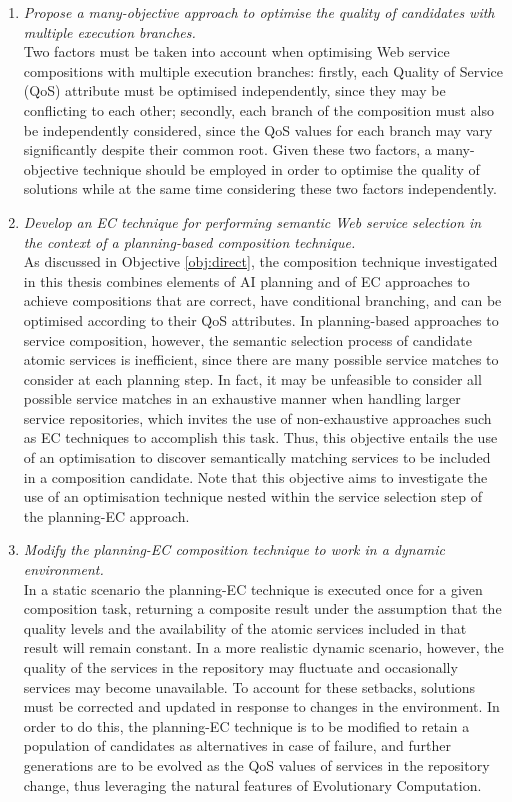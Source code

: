 \begin{enumerate}
 \item \label{obj:mo} \textit{Propose a many-objective approach to optimise the quality of candidates with multiple execution branches.}\\
 Two factors must be taken into account when optimising Web service compositions with multiple execution branches: firstly, each Quality of Service (QoS) attribute must be optimised independently, since they may be conflicting to each other; secondly, each branch of the composition must also be independently considered, since the QoS values for each branch may vary significantly despite their common root. Given these two factors, a many-objective technique should be employed in order to optimise the quality of solutions while at the same time considering these two factors independently.
 
 \item \label{obj:semantic} \textit{Develop an EC technique for performing semantic Web service selection in the context of a planning-based composition technique.}\\
 As discussed in Objective \ref{obj:direct}, the composition technique investigated in this thesis combines elements of AI planning and of EC approaches to achieve compositions that are correct, have conditional branching, and can be optimised according to their QoS attributes. In planning-based approaches to service composition, however, the semantic selection process of candidate atomic services is inefficient, since there are many possible service matches to consider at each planning step. In fact, it may be unfeasible to consider all possible service matches in an exhaustive manner when handling larger service repositories, which invites the use of non-exhaustive approaches such as EC techniques to accomplish this task. Thus, this objective entails the use of an optimisation to discover semantically matching services to be included in a composition candidate. Note that this objective aims to investigate the use of an optimisation technique nested within the service selection step of the planning-EC approach.
 
 \item \label{obj:dynamic} \textit{Modify the planning-EC composition technique to work in a dynamic environment.}\\
 In a static scenario the planning-EC technique is executed once for a given composition task, returning a composite result under the assumption that the quality levels and the availability of the atomic services included in that result will remain constant. In a more realistic dynamic scenario, however, the quality of the services in the repository may fluctuate and occasionally services may become unavailable. To account for these setbacks, solutions must be corrected and updated in response to changes in the environment. In order to do this, the planning-EC technique is to be modified to retain a population of candidates as alternatives in case of failure, and further generations are to be evolved as the QoS values of services in the repository change, thus leveraging the natural features of Evolutionary Computation.
 
\end{enumerate}

